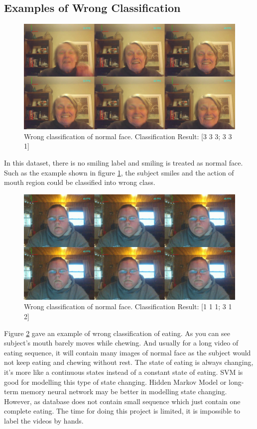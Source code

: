 \subsection{Examples of Wrong Classification}
\begin{figure}[ht]
\centering
\includegraphics[width = \textwidth]{imgs/Wrong_NF00.jpg}
\caption{Wrong classification of normal face. Classification Result: [3 3 3; 3 3 1]}
\label{fig:EXPNF}
\end{figure}
In this dataset, there is no smiling label and smiling is treated as normal face. Such as the example shown in figure \ref{fig:EXPNF}, the subject smiles and the action of mouth region could be classified into wrong class.
\begin{figure}[ht]
\centering
\includegraphics[width = \textwidth]{imgs/Wrong_E00.jpg}
\caption{Wrong classification of normal face. Classification Result: [1 1 1; 3 1 2]}
\label{fig:EXPE}
\end{figure}
\newline
Figure \ref{fig:EXPE} gave an example of wrong classification of eating. As you can see subject's mouth barely moves while chewing. And usually for a long video of eating sequence, it will contain many images of normal face as the subject would not keep eating and chewing without rest. The state of eating is always changing, it's more like a continuous states instead of a constant state of eating. SVM is good for modelling this type of state changing. Hidden Markov Model or long-term memory neural network may be better in modelling state changing. However, as database does not contain small sequence which just contain one complete eating. The time for doing this project is limited, it is  impossible to label the videos by hands.
